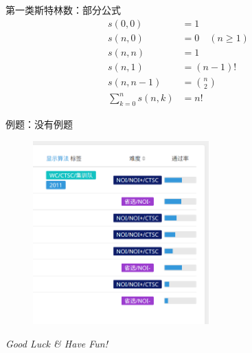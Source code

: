 \documentclass[12pt,aspectratio=169,handout]{beamer}
\begin{document}
\begin{frame}[fragile]{第一类斯特林数：部分公式}
$$
\begin{aligned}
  s(0, 0) &= 1 \\
  s(n, 0) &= 0 \quad (n \ge 1) \\
  s(n, n) &= 1 \\
  s(n, 1) &= (n-1)! \\
  s(n, n-1) &= {n \choose 2} \\
  \sum_{k=0}^{n}s(n, k) &= n!
\end{aligned}
$$
\end{frame}

\begin{frame}[fragile]{例题：没有例题}
\begin{figure}
  \includegraphics[height=200pt]{stirling.png}
\end{figure}
\end{frame}

\begin{frame}{}
  \centering \Large
  \emph{Good Luck \& Have Fun!}
\end{frame}
\end{document}
